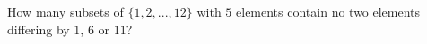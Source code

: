 How many subsets of $\{1, 2,..., 12\}$ with $5$ elements contain no two elements differing by $1$, $6$ or $11$?
